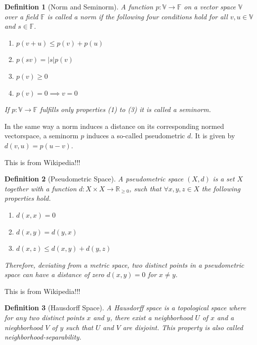 \documentclass[12pt, a4paper]{article}
\theoremstyle{MAstyle} \newtheorem{assumption}{Assumption}[section]
\theoremstyle{MAstyle} \newtheorem{definition}{Definition}[section]
\begin{document}
			\begin{definition}[Norm and Seminorm]
				A function $p : \mathbb{V} \rightarrow \mathbb{F}$ on a vector space $\mathbb{V}$ over a field $\mathbb{F}$ is called a norm if the following four conditions hold for all $v,u \in \mathbb{V}$ and $s \in \mathbb{F}$.
				\begin{multicols}{2}
					\begin{enumerate}
						\item $p(v + u) \leq p(v) + p(u)$
						\item $p(sv) = |s| p(v)$
						\item $p(v) \geq 0$
						\item $p(v) = 0 \implies v = 0$
					\end{enumerate}
				\end{multicols}
				If $p : \mathbb{V} \rightarrow \mathbb{F}$ fulfills only properties (1) to (3) it is called a seminorm.
			\end{definition}
		
			In the same way a norm induces a distance on its corresponding normed vectorspace, a seminorm $p$ induces a so-called pseudometric $d$. It is given by $d(v,u) = p(u-v)$.
			
			{\color{red} This is from Wikipedia!!!}
			\begin{definition}[Pseudometric Space]
				A pseudometric space $\left(X, d\right)$ is a set $X$ together with a function $d:X\times X \rightarrow \mathbb{R}_{\geq 0}$, such that $\forall x,y,z \in X$ the following properties hold.
				\begin{multicols}{2}
					\begin{enumerate}
						\item $d(x,x) = 0$
						\item $d(x,y) = d(y,x)$
						\item $d(x,z) \leq d(x,y) + d(y,z)$
					\end{enumerate}
				\end{multicols}
				Therefore, deviating from a metric space, two distinct points in a pseudometric space can have a distance of zero $d(x,y) = 0$ for $x \neq y$.
			\end{definition}
			
			{\color{red} This is from Wikipedia!!!}
			\begin{definition}[Hausdorff Space]
				A Hausdorff space is a topological space where for any two distinct points $x$ and $y$, there exist a neighborhood $U$ of $x$ and a nieghborhood $V$ of $y$ such that $U$ and $V$ are disjoint. This property is also called neighborhood-separability.
			\end{definition}
			
\end{document}
